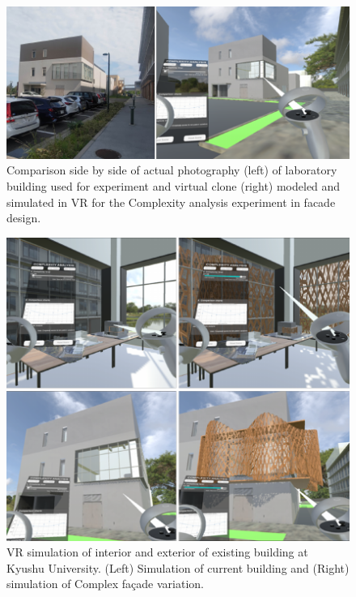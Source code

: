 
     \begin{figure}[t]
          \centering
          \includegraphics[width= \linewidth]{Images/RealvsVRBuildling}
          \caption{Comparison side by side of actual photography (left) of laboratory building used for experiment and virtual clone (right) modeled and simulated in VR for the Complexity analysis experiment in facade design.}
          \label{fig:RealVsVR}
        \end{figure}

     \begin{figure}[t]
          \centering
          \includegraphics[width= \linewidth]{Images/VRInteriorExterior}
          \caption{VR simulation of interior and exterior of existing building at Kyushu University. (Left) Simulation of current building and (Right) simulation of Complex façade variation.}
          \label{fig:VRInteriorExterior}
        \end{figure}
